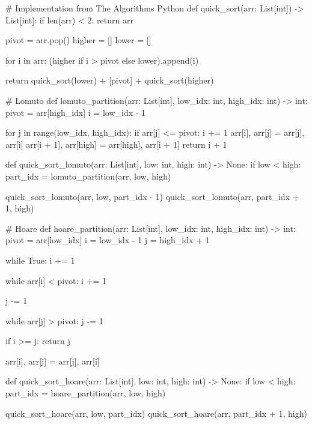 \documentclass[12pt,dvipsnames,svgnames,x11names]{article}
\begin{document}
\begin{python}
# Implementation from The Algorithms Python
def quick_sort(arr: List[int]) -> List[int]:
  if len(arr) < 2:
    return arr
    
  pivot = arr.pop()
  higher = []
  lower = []
  
  for i in arr:
    (higher if i > pivot else lower).append(i)
    
  return quick_sort(lower) + [pivot] + quick_sort(higher)
  
  
# Lomuto
def lomuto_partition(arr: List[int], low_idx: int, high_idx: int) -> int:
  pivot = arr[high_idx]
  i = low_idx - 1
  
  for j in range(low_idx, high_idx):
    if arr[j] <= pivot:
      i += 1
      arr[i], arr[j] = arr[j], arr[i]
  arr[i + 1], arr[high] = arr[high], arr[i + 1]
  return i + 1
  
  
def quick_sort_lomuto(arr: List[int], low: int, high: int) -> None:
  if low < high:
    part_idx = lomuto_partition(arr, low, high)
    
    quick_sort_lomuto(arr, low, part_idx - 1)
    quick_sort_lomuto(arr, part_idx + 1, high)
    
    
# Hoare
def hoare_partition(arr: List[int], low_idx: int, high_idx: int) -> int:
  pivot = arr[low_idx]
  i = low_idx - 1
  j = high_idx + 1
  
  while True:
    i += 1
    
    while arr[i] < pivot:
      i += 1
      
    j -= 1
    
    while arr[j] > pivot:
      j -= 1
      
    if i >= j:
      return j
      
    arr[i], arr[j] = arr[j], arr[i]
    
    
def quick_sort_hoare(arr: List[int], low: int, high: int) -> None:
  if low < high:
    part_idx = hoare_partition(arr, low, high)
    
    quick_sort_hoare(arr, low, part_idx)
    quick_sort_hoare(arr, part_idx + 1, high)
\end{python}
\end{document}
